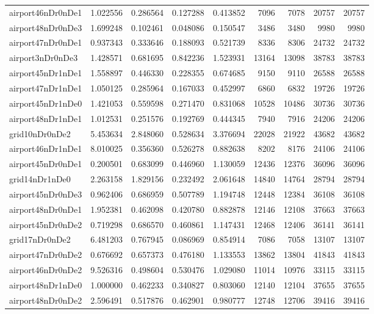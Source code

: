 \begin{longtable}{|l|r|r|r|r|r|r|r|r|}
airport46nDr0nDe1 & 1.022556 & 0.286564 & 0.127288 & 0.413852 & 7096 & 7078 & 20757 & 20757 \\
airport48nDr0nDe3 & 1.699248 & 0.102461 & 0.048086 & 0.150547 & 3486 & 3480 & 9980 & 9980 \\
airport47nDr0nDe1 & 0.937343 & 0.333646 & 0.188093 & 0.521739 & 8336 & 8306 & 24732 & 24732 \\
airport3nDr0nDe3 & 1.428571 & 0.681695 & 0.842236 & 1.523931 & 13164 & 13098 & 38783 & 38783 \\
airport45nDr1nDe1 & 1.558897 & 0.446330 & 0.228355 & 0.674685 & 9150 & 9110 & 26588 & 26588 \\
airport47nDr1nDe1 & 1.050125 & 0.285964 & 0.167033 & 0.452997 & 6860 & 6832 & 19726 & 19726 \\
airport45nDr1nDe0 & 1.421053 & 0.559598 & 0.271470 & 0.831068 & 10528 & 10486 & 30736 & 30736 \\
airport48nDr1nDe1 & 1.012531 & 0.251576 & 0.192769 & 0.444345 & 7940 & 7916 & 24206 & 24206 \\
grid10nDr0nDe2 & 5.453634 & 2.848060 & 0.528634 & 3.376694 & 22028 & 21922 & 43682 & 43682 \\
airport46nDr1nDe1 & 8.010025 & 0.356360 & 0.526278 & 0.882638 & 8202 & 8176 & 24106 & 24106 \\
airport45nDr0nDe1 & 0.200501 & 0.683099 & 0.446960 & 1.130059 & 12436 & 12376 & 36096 & 36096 \\
grid14nDr1nDe0 & 2.263158 & 1.829156 & 0.232492 & 2.061648 & 14840 & 14764 & 28794 & 28794 \\
airport45nDr0nDe3 & 0.962406 & 0.686959 & 0.507789 & 1.194748 & 12448 & 12384 & 36108 & 36108 \\
airport48nDr0nDe1 & 1.952381 & 0.462098 & 0.420780 & 0.882878 & 12146 & 12108 & 37663 & 37663 \\
airport45nDr0nDe2 & 0.719298 & 0.686570 & 0.460861 & 1.147431 & 12468 & 12406 & 36141 & 36141 \\
grid17nDr0nDe2 & 6.481203 & 0.767945 & 0.086969 & 0.854914 & 7086 & 7058 & 13107 & 13107 \\
airport47nDr0nDe2 & 0.676692 & 0.657373 & 0.476180 & 1.133553 & 13862 & 13804 & 41843 & 41843 \\
airport46nDr0nDe2 & 9.526316 & 0.498604 & 0.530476 & 1.029080 & 11014 & 10976 & 33115 & 33115 \\
airport48nDr1nDe0 & 1.000000 & 0.462233 & 0.340827 & 0.803060 & 12140 & 12104 & 37655 & 37655 \\
airport48nDr0nDe2 & 2.596491 & 0.517876 & 0.462901 & 0.980777 & 12748 & 12706 & 39416 & 39416 \\

\end{longtable}
